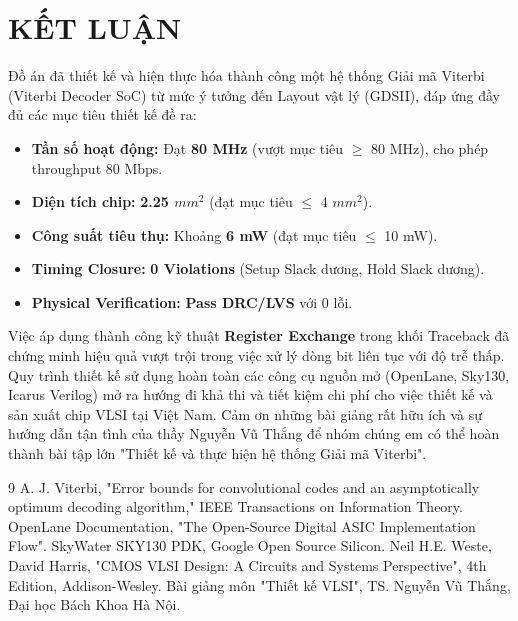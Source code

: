 \documentclass[12pt,a4paper]{report}
\begin{document}
\chapter*{KẾT LUẬN}

Đồ án đã thiết kế và hiện thực hóa thành công một hệ thống Giải mã Viterbi (Viterbi Decoder SoC) từ mức ý tưởng đến Layout vật lý (GDSII), đáp ứng đầy đủ các mục tiêu thiết kế đề ra:

\begin{itemize}
    \item \textbf{Tần số hoạt động:} Đạt \textbf{80 MHz} (vượt mục tiêu $\geq$ 80 MHz), cho phép throughput 80 Mbps.
    \item \textbf{Diện tích chip:} \textbf{2.25 $mm^2$} (đạt mục tiêu $\leq$ 4 $mm^2$).
    \item \textbf{Công suất tiêu thụ:} Khoảng \textbf{6 mW} (đạt mục tiêu $\leq$ 10 mW).
    \item \textbf{Timing Closure:} \textbf{0 Violations} (Setup Slack dương, Hold Slack dương).
    \item \textbf{Physical Verification:} \textbf{Pass DRC/LVS} với 0 lỗi.
\end{itemize}

Việc áp dụng thành công kỹ thuật \textbf{Register Exchange} trong khối Traceback đã chứng minh hiệu quả vượt trội trong việc xử lý dòng bit liên tục với độ trễ thấp. Quy trình thiết kế sử dụng hoàn toàn các công cụ nguồn mở (OpenLane, Sky130, Icarus Verilog) mở ra hướng đi khả thi và tiết kiệm chi phí cho việc thiết kế và sản xuất chip VLSI tại Việt Nam. Cảm ơn những bài giảng rất hữu ích và sự hướng dẫn tận tình của thầy Nguyễn Vũ Thắng để nhóm chúng em có thể hoàn thành bài tập lớn "Thiết kế và thực hiện hệ thống Giải mã Viterbi".

\newpage
\begin{thebibliography}{9}
 A. J. Viterbi, "Error bounds for convolutional codes and an asymptotically optimum decoding algorithm," IEEE Transactions on Information Theory.
 OpenLane Documentation, "The Open-Source Digital ASIC Implementation Flow".
 SkyWater SKY130 PDK, Google Open Source Silicon.
 Neil H.E. Weste, David Harris, "CMOS VLSI Design: A Circuits and Systems Perspective", 4th Edition, Addison-Wesley.
 Bài giảng môn "Thiết kế VLSI", TS. Nguyễn Vũ Thắng, Đại học Bách Khoa Hà Nội.
\end{thebibliography}
\end{document}
